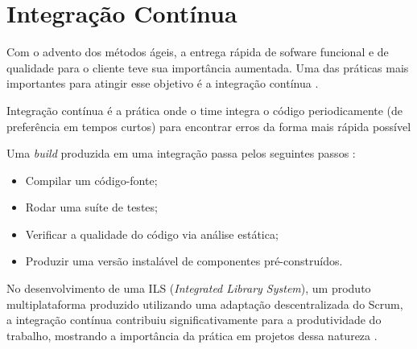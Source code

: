 \section{Integração Contínua}

Com o advento dos métodos ágeis, a entrega rápida de sofware funcional e de qualidade para o cliente teve sua importância aumentada. Uma das práticas mais importantes para atingir esse objetivo é a integração contínua \cite{continuous-integration}. 

Integração contínua é a prática onde o time integra o código periodicamente (de preferência em tempos curtos) para encontrar erros da forma mais rápida possível \cite{fowler}

Uma \textit{build} produzida em uma integração passa pelos seguintes passos \cite{continuous-integration}:
\begin{itemize}
\item Compilar um código-fonte;
\item Rodar uma suíte de testes; 
\item Verificar a qualidade do código via análise estática;
\item Produzir uma versão instalável de componentes pré-construídos. 
\end{itemize}

No desenvolvimento de uma ILS (\textit{Integrated Library System}), um produto multiplataforma produzido utilizando uma adaptação descentralizada do Scrum, a integração contínua contribuiu significativamente para a produtividade do trabalho, mostrando a importância da prática em projetos dessa natureza \cite{sutherland}.

